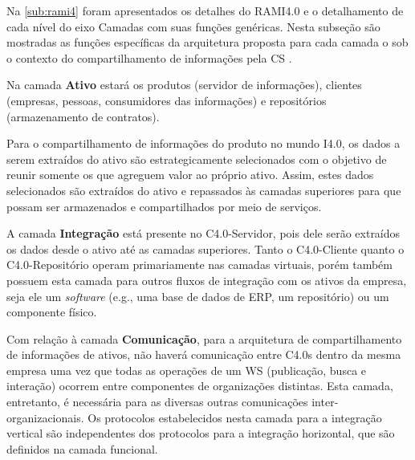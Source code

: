 Na \autoref{sub:rami4} foram apresentados os detalhes do RAMI4.0 e o detalhamento de cada nível do eixo Camadas com suas funções genéricas. Nesta subseção são mostradas as funções específicas da arquitetura proposta para cada camada o sob o contexto do compartilhamento de informações pela CS .

Na camada \textbf{Ativo} estará os produtos (servidor de informações), clientes (empresas, pessoas, consumidores das informações) e repositórios (armazenamento de contratos).

Para o compartilhamento de informações do produto no mundo I4.0, os dados a serem extraídos do ativo são estrategicamente selecionados com o objetivo de reunir somente os que agreguem valor ao próprio ativo. Assim, estes dados selecionados são extraídos do ativo e repassados às camadas superiores para que possam ser armazenados e compartilhados por meio de serviços.

A camada \textbf{Integração} está presente no C4.0-Servidor, pois dele serão extraídos os dados desde o ativo até as camadas superiores. Tanto o C4.0-Cliente quanto o C4.0-Repositório operam primariamente nas camadas virtuais, porém também possuem esta camada para outros fluxos de integração com os ativos da empresa, seja ele um \textit{software} (e.g., uma base de dados de ERP, um repositório) ou um componente físico.

Com relação à camada \textbf{Comunicação}, para a arquitetura de compartilhamento de informações de ativos, não haverá comunicação entre C4.0s dentro da mesma empresa uma vez que todas as operações de um WS (publicação, busca e interação) ocorrem entre componentes de organizações distintas. Esta camada, entretanto, é necessária para as diversas outras comunicações inter-organizacionais. Os protocolos estabelecidos nesta camada para a integração vertical são independentes dos protocolos para a integração horizontal, que são definidos na camada funcional.


